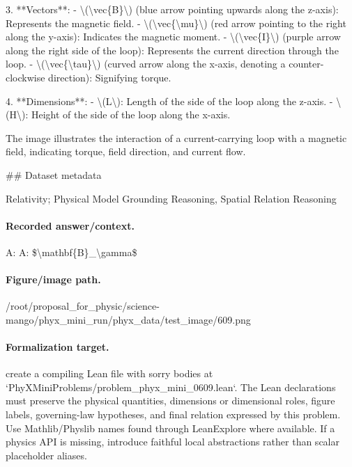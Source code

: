 3. **Vectors**:
   - \textbackslash{}(\textbackslash{}vec\{B\}\textbackslash{}) (blue arrow pointing upwards along the z-axis): Represents the magnetic field.
   - \textbackslash{}(\textbackslash{}vec\{\textbackslash{}mu\}\textbackslash{}) (red arrow pointing to the right along the y-axis): Indicates the magnetic moment.
   - \textbackslash{}(\textbackslash{}vec\{I\}\textbackslash{}) (purple arrow along the right side of the loop): Represents the current direction through the loop.
   - \textbackslash{}(\textbackslash{}vec\{\textbackslash{}tau\}\textbackslash{}) (curved arrow along the x-axis, denoting a counter-clockwise direction): Signifying torque.

4. **Dimensions**:
   - \textbackslash{}(L\textbackslash{}): Length of the side of the loop along the z-axis.
   - \textbackslash{}(H\textbackslash{}): Height of the side of the loop along the x-axis.

The image illustrates the interaction of a current-carrying loop with a magnetic field, indicating torque, field direction, and current flow.

\#\# Dataset metadata

Relativity; Physical Model Grounding Reasoning, Spatial Relation Reasoning

\paragraph{Recorded answer/context.}
A: A: \$\textbackslash{}mathbf\{B\}\_\textbackslash{}gamma\$

\paragraph{Figure/image path.}
/root/proposal\_for\_physic/science-mango/phyx\_mini\_run/phyx\_data/test\_image/609.png

\paragraph{Formalization target.}
create a compiling Lean file with sorry bodies at `PhyXMiniProblems/problem\_phyx\_mini\_0609.lean`. The Lean declarations must preserve the physical quantities, dimensions or dimensional roles, figure labels, governing-law hypotheses, and final relation expressed by this problem.
Use Mathlib/Physlib names found through LeanExplore where available. If a physics API is missing, introduce faithful local abstractions rather than scalar placeholder aliases.

